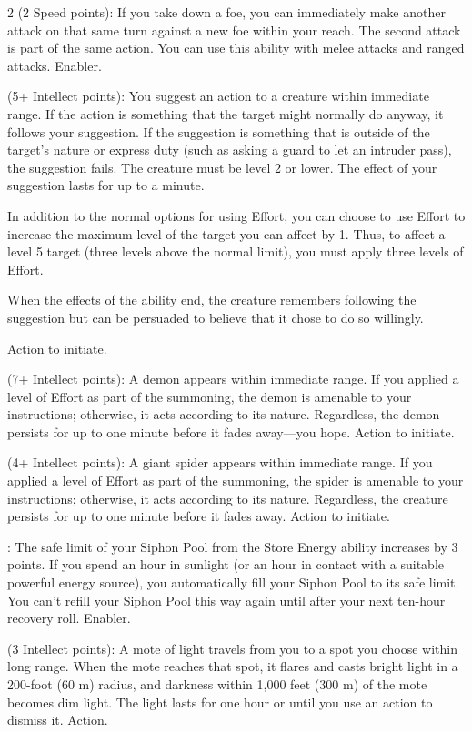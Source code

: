 \begin{multicols}{2}
 (2 Speed points): If you take down a foe, you can immediately make another attack on that same turn against a new foe within your reach. The second attack is part of the same action. You can use this ability with melee attacks and ranged attacks. Enabler. 
 
 (5+ Intellect points): You suggest an action to a creature within immediate range. If the action is something that the target might normally do anyway, it follows your suggestion. If the suggestion is something that is outside of the target’s nature or express duty (such as asking a guard to let an intruder pass), the suggestion fails. The creature must be level 2 or lower. The effect of your suggestion lasts for up to a minute. 

In addition to the normal options for using Effort, you can choose to use Effort to increase the maximum level of the target you can affect by 1. Thus, to affect a level 5 target (three levels above the normal limit), you must apply three levels of Effort.

When the effects of the ability end, the creature remembers following the suggestion but can be persuaded to believe that it chose to do so willingly. 

Action to initiate. 
 
 (7+ Intellect points): A demon appears within immediate range. If you applied a level of Effort as part of the summoning, the demon is amenable to your instructions; otherwise, it acts according to its nature. Regardless, the demon persists for up to one minute before it fades away—you hope. Action to initiate. 
 
 (4+ Intellect points): A giant spider appears within immediate range. If you applied a level of Effort as part of the summoning, the spider is amenable to your instructions; otherwise, it acts according to its nature. Regardless, the creature persists for up to one minute before it fades away. Action to initiate. 

: The safe limit of your Siphon Pool from the Store Energy ability increases by 3 points. If you spend an hour in sunlight (or an hour in contact with a suitable powerful energy source), you automatically fill your Siphon Pool to its safe limit. You can’t refill your Siphon Pool this way again until after your next ten-hour recovery roll. Enabler.
 
 (3 Intellect points): A mote of light travels from you to a spot you choose within long range. When the mote reaches that spot, it flares and casts bright light in a 200-foot (60 m) radius, and darkness within 1,000 feet (300 m) of the mote becomes dim light. The light lasts for one hour or until you use an action to dismiss it. Action.
 

\end{multicols}
